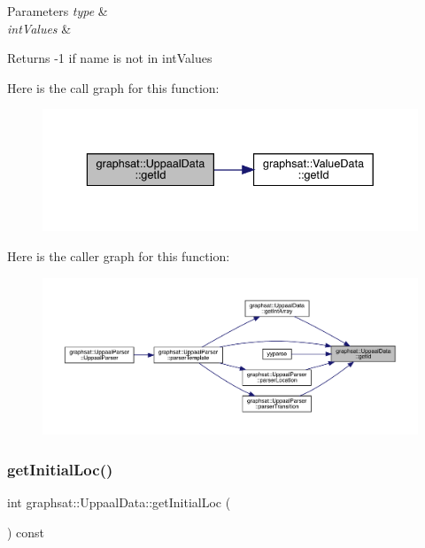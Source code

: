 \begin{DoxyParams}{Parameters}
{\em type} & \\
\hline
{\em int\+Values} & \\
\hline
\end{DoxyParams}
\begin{DoxyReturn}{Returns}
-\/1 if name is not in int\+Values 
\end{DoxyReturn}
Here is the call graph for this function\+:\nopagebreak
\begin{figure}[H]
\begin{center}
\leavevmode
\includegraphics[width=336pt]{classgraphsat_1_1_uppaal_data_a39f89632de7e1d1a1f2b1fb1fbd05bd1_cgraph}
\end{center}
\end{figure}
Here is the caller graph for this function\+:\nopagebreak
\begin{figure}[H]
\begin{center}
\leavevmode
\includegraphics[width=350pt]{classgraphsat_1_1_uppaal_data_a39f89632de7e1d1a1f2b1fb1fbd05bd1_icgraph}
\end{center}
\end{figure}
\mbox{\label{classgraphsat_1_1_uppaal_data_a261013813b76f6590e4c5e9b52fe8e12}} 
\subsubsection{\texorpdfstring{getInitialLoc()}{getInitialLoc()}}
{\footnotesize\ttfamily int graphsat\+::\+Uppaal\+Data\+::get\+Initial\+Loc (\begin{DoxyParamCaption}{ }\end{DoxyParamCaption}) const\hspace{0.3cm}{\ttfamily [inline]}}


